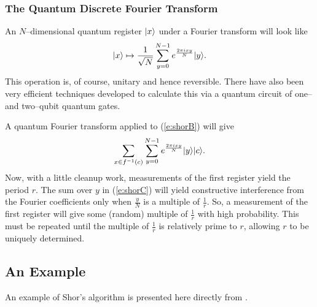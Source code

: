 \subsubsection{The Quantum Discrete Fourier Transform}

An $N$--dimensional quantum register ${|{x}\rangle}$ under a Fourier 
transform will look like 
\begin{equation}
{|{x}\rangle} \mapsto 
\frac{1}{\sqrt{N}}
\sum_{y=0}^{N-1} e^{\frac{2\pi ixy}{N}}{|{y}\rangle}.
\label{e:qdft}
\end{equation}
This operation is, of course, unitary and hence reversible.
There have also been very efficient techniques developed to
calculate this via a quantum circuit\cite{Coppersmith:94}
of one-- and two--qubit quantum gates.

A quantum Fourier transform applied to (\ref{e:shorB})
will give
\begin{equation}
\sum_{x\in f^{-1}(c)}\sum_{y=0}^{N-1} e^{\frac{2\pi ixy}{N}}{|{y}\rangle}{|{c}\rangle}.
\label{e:shorC}
\end{equation}
Now, with a little cleanup work, measurements of the first 
register yield the period $r$.  The sum over $y$ in 
(\ref{e:shorC}) will yield constructive interference from
the Fourier coefficients 
only when $\frac{y}{N}$ is a multiple of $\frac{1}{r}$.
So, a measurement of the first register will give 
some (random) multiple of $\frac{1}{r}$ with high probability.
This must be repeated until the multiple of $\frac{1}{r}$ is
relatively prime to $r$, allowing $r$ to be uniquely determined.


\subsection{An Example}

An example of Shor's algorithm is presented here directly
from \cite{Braunstein:96}.

